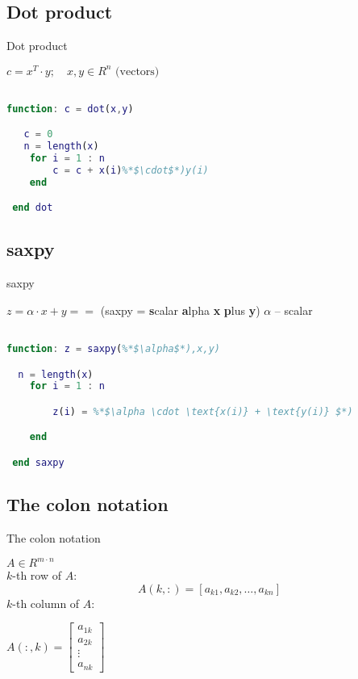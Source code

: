 \subsection{Dot product}

\begin{frame}[fragile]{Dot product}


$ c = x^T\cdot y; \quad x,y \in R^n\text{ (vectors)} $

\vspace{10px}
 \begin{lstlisting}[language=Matlab]

function: c = dot(x,y)

   c = 0
   n = length(x)
 	for i = 1 : n
 		c = c + x(i)%*$\cdot$*)y(i)
 	end

 end dot
 \end{lstlisting}


\end{frame}

\subsection{saxpy}

\begin{frame}[fragile]{saxpy}

$ z = \alpha \cdot x + y == $ (saxpy = \textbf{s}calar \textbf{a}lpha \textbf{x} \textbf{p}lus \textbf{y})  $\alpha$ -- scalar
\vspace{10px}
 \begin{lstlisting}[language=Matlab]

function: z = saxpy(%*$\alpha$*),x,y)

  n = length(x)
 	for i = 1 : n

 		z(i) = %*$\alpha \cdot \text{x(i)} + \text{y(i)} $*)

 	end

 end saxpy
 \end{lstlisting}

\end{frame}


\subsection{The colon notation}

\begin{frame}{The colon notation}

$ A\in R^{m\cdot n} $ \\
\vspace{10px}
$k$-th row of $A$:
$$A(k, :) = [a_{k1}, a_{k2}, \dots , a_{kn}]$$
$k$-th column of $A$:
\vspace{10px}

\begin{center}
$A(:, k) = \left [ \begin{array}{l}
   a_{1k} \\
   a_{2k}\\
   \vdots\\
   a_{nk}
\end{array}
\right ] $
\end{center}

\end{frame}
